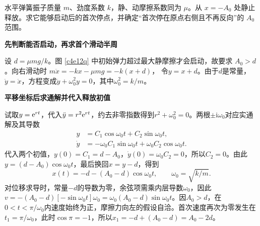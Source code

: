\begin{question}
\begin{example}[有干摩擦的弹簧首次停点]
水平弹簧振子质量 $m$、劲度系数 $k$，静、动摩擦系数同为 $\mu$。从 $x=-A_0$ 处静止释放。求它能够启动后的首次停点，并确定“首次停在原点右侧且不再反向”的 $A_0$ 范围。
\end{example}
\end{question}
\begin{solution}\textbf{先判断能否启动，再求首个滑动半周}\par\nobreak
设 $d=\mu mg/k$。图 \ref{c4e12q} 中初始弹力超过最大静摩擦才会启动，故要求 $A_0>d$。向右滑动时
$m\ddot x=-kx-\mu mg=-k(x+d)$，
令$y=x+d$。由于$d$是常量，$\ddot y=\ddot x$，方程变成$\ddot y+\omega_0^2y=0$，其中$\omega_0^2=k/m$。

\par\medskip{}\noindent\textbf{平移坐标后求通解并代入释放初值}\par\nobreak
试取$y=\mathrm e^{rt}$，代入$\ddot y=r^2\mathrm e^{rt}$，约去非零指数得到$r^2+\omega_0^2=0$。两根$\pm\mathrm i\omega_0$对应实通解及其导数
\begin{align*}
y&=C_1\cos\omega_0t+C_2\sin\omega_0t,\\
\dot y&=-\omega_0C_1\sin\omega_0t+\omega_0C_2\cos\omega_0t.
\end{align*}
代入两个初值，$y(0)=C_1=d-A_0$，$\dot y(0)=\omega_0C_2=0$，所以$C_2=0$。由此$y=(d-A_0)\cos\omega_0t$，最后换回$x=y-d$，得到
\[
 x(t)=-d-(A_0-d)\cos\omega_0t,\qquad \omega_0=\sqrt{k/m}.
\]
对位移求导时，常量$-d$的导数为零，余弦项需乘内层导数$\omega_0$，因此$v=-(A_0-d)[-\sin\omega_0t]\omega_0=\omega_0(A_0-d)\sin\omega_0t$。因$A_0>d$，在$0<t<\pi/\omega_0$内速度始终为正，摩擦力向左的假设自洽。首次速度再次为零发生在$t_1=\pi/\omega_0$，此时$\cos\pi=-1$，所以$x_1=-d+(A_0-d)=A_0-2d$。




\end{solution}
